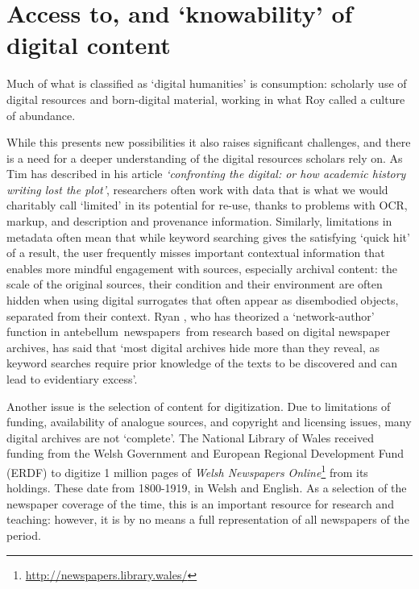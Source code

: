 \documentclass[amsthm,ebook]{saparticle}
\begin{document}
\section{Access to, and `knowability' of digital content}

Much of what is classified as `digital humanities' is consumption: scholarly use of digital resources and born-digital material, working in what Roy \citet[22]{Rosenzweig:2010aa} called a culture of abundance.

 While this presents new possibilities it also raises significant challenges, and there is a need for a deeper understanding of the digital resources scholars rely on. As Tim \citet{Hitchcock:2013aa} has described in his article \emph{`confronting the digital: or how academic history writing lost the plot'}, researchers often work with data that is what we would charitably call ‘limited’ in its potential for re-use, thanks to problems with OCR, markup, and description and provenance information. Similarly, limitations in metadata often mean that while keyword searching gives the satisfying `quick hit' of a result, the user frequently misses important contextual information that enables more mindful engagement with sources, especially archival content: the scale of the original sources, their condition and their environment are often hidden when using digital surrogates that often appear as disembodied objects, separated from their context. Ryan \citet{Cordell:2015aa}, who has theorized a `network-author' function in antebellum newspapers from research based on digital newspaper archives, has said that `most digital archives hide more than they reveal, as keyword searches require prior knowledge of the texts to be discovered and can lead to evidentiary excess'.

Another issue is the selection of content for digitization. Due to limitations of funding, availability of analogue sources, and copyright and licensing issues, many digital archives are not ‘complete’. The National Library of Wales received funding from the Welsh Government and European Regional Development Fund (ERDF) to digitize 1 million pages of \emph{Welsh Newspapers Online}\footnote{\url{http://newspapers.library.wales/}} from its holdings. These date from 1800-1919, in Welsh and English. As a selection of the newspaper coverage of the time, this is an important resource for research and teaching: however, it is by no means a full representation of all newspapers of the period. 
\end{document}
